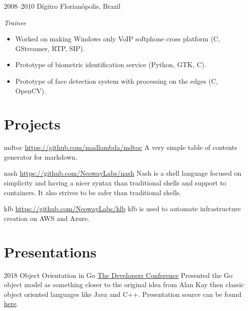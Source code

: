 \documentclass[]{friggeri-cv} %
\begin{document}
\begin{entrylist}
\entry
{2008--2010}
{Dígitro}
{Florianópolis, Brazil}
{\emph{Trainee} \\

\begin{itemize}
  \item Worked on making Windows only VoIP softphone cross platform (C, GStreamer, RTP, SIP).
  \item Prototype of biometric identification service (Python, GTK, C).
  \item Prototype of face detection system with processing on the edges (C, OpenCV).
\end{itemize}

}
\end{entrylist}

\section{Projects}

\begin{entrylist}
\entry
{}
{mdtoc}
{\href{https://github.com/madlambda/mdtoc}{https://github.com/madlambda/mdtoc}}
{
A very simple table of contents generator for markdown.
}
\end{entrylist}

\begin{entrylist}
\entry
{}
{nash}
{\href{https://github.com/NeowayLabs/nash}{https://github.com/NeowayLabs/nash}}
{
Nash is a shell language focused on simplicity and having a nicer syntax
than traditional shells and support to containers. It also strives to be
safer than traditional shells.
}
\end{entrylist}

\begin{entrylist}
\entry
{}
{klb}
{\href{https://github.com/NeowayLabs/klb}{https://github.com/NeowayLabs/klb}}
{
klb is used to automate infrastructure creation on AWS and Azure.
}
\end{entrylist}

\section{Presentations}

\begin{entrylist}
\entry
{2018}
{Object Orientation in Go}
{\href{http://www.thedevelopersconference.com.br/tdc/2018/florianopolis/trilha-golang}{The Developers Conference}}
{
Presented the Go object model as something closer to the original
idea from Alan Kay then classic object oriented languages like Java and C++.
Presentation source can be found \href{https://github.com/katcipis/my.presentations/blob/master/gooo/gooo.slide}{here}.
}
\end{entrylist}
\end{document}
